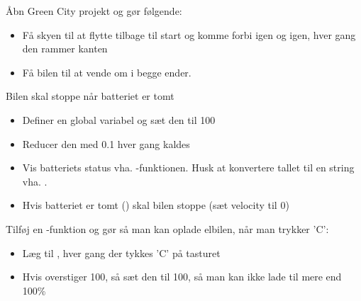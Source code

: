 \documentclass{ucph-handout}
\begin{document}
%
\begin{exercisebox}[adjusted title=Flere opgaver om betingelser]
Åbn Green City projekt og gør følgende:
\begin{itemize}
\item Få skyen til at flytte tilbage til start og komme forbi igen og
  igen, hver gang den rammer kanten
\item Få bilen til at vende om i begge ender.
\end{itemize}
Bilen skal stoppe når batteriet er tomt
  \begin{itemize}
  \item Definer en global variabel  og sæt den til 100
  \item Reducer den med 0.1 hver gang  kaldes
  \item Vis batteriets status vha. -funktionen.
    Husk at konvertere tallet til en string vha. .
  \item Hvis batteriet er tomt () skal bilen stoppe (sæt velocity til 0)
  \end{itemize}
Tilføj en   -funktion og gør så man kan oplade elbilen, når man trykker 'C':
  \begin{itemize}
  \item Læg  til , hver gang der tykkes 'C' på tasturet
  \item Hvis  overstiger 100, så sæt den til 100, så man kan ikke lade til mere end 100\%
 \end{itemize}
\end{exercisebox}


\end{document}
